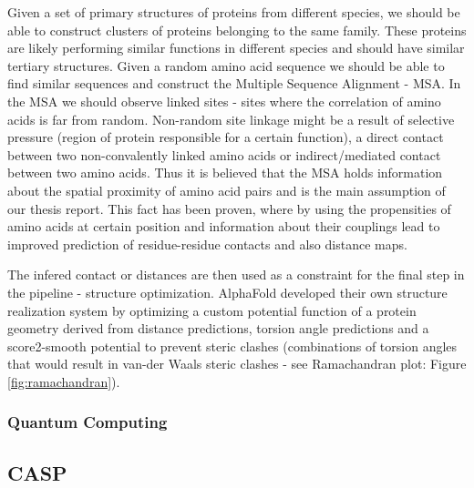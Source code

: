 
Given a set of primary structures of proteins from different species, we should be able to construct clusters of proteins belonging to the same family. 
These proteins are likely performing similar functions in different species and should have similar tertiary structures. 
Given a random amino acid sequence we should be able to find similar sequences and construct the Multiple Sequence Alignment - MSA. 
In the MSA we should observe linked sites - sites where the correlation of amino acids is far from random. 
Non-random site linkage might be a result of selective pressure (region of protein responsible for a certain function), a direct contact between two non-convalently linked amino acids or indirect/mediated contact between two amino acids. 
Thus it is believed that the MSA holds information about the spatial proximity of amino acid pairs and is the main assumption of our thesis report.
This fact has been proven, where by using the propensities of amino acids at certain position and information about their couplings lead to improved prediction of residue-residue contacts and also distance maps.

The infered contact or distances  are then used as a constraint for the final step in the pipeline - structure optimization. AlphaFold developed their own structure realization system by optimizing a custom potential function of a protein geometry derived from distance predictions, torsion angle predictions and a score2-smooth potential to prevent steric clashes (combinations of torsion angles that would result in van-der Waals steric clashes - see Ramachandran plot: Figure \ref{fig:ramachandran}).

\subsubsection{Quantum Computing}

\subsection{CASP}

